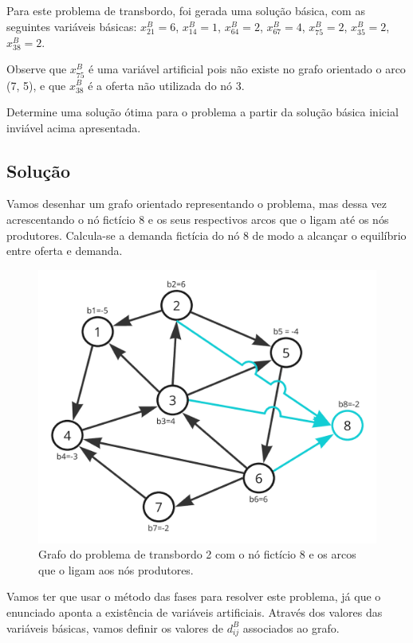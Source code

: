 \documentclass{article}
\begin{document}
Para este problema de transbordo, foi gerada uma solução básica, com as seguintes variáveis básicas:
$x^{B}_{21} = 6$,
$x^{B}_{14} = 1$,
$x^{B}_{64} = 2$,
$x^{B}_{67} = 4$,
$x^{B}_{75} = 2$,
$x^{B}_{35} = 2$,
$x^{B}_{38} = 2$.

Observe que $x^{B}_{75}$ é uma variável artificial pois não existe no grafo orientado o arco (7, 5), e que $x^{B}_{38}$ é a oferta não utilizada do nó 3.

Determine uma solução ótima para o problema a partir da solução básica inicial inviável acima apresentada.


\subsection{Solução}

Vamos desenhar um grafo orientado representando o problema, mas dessa vez acrescentando o nó fictício 8 e os seus respectivos arcos que o ligam até os nós produtores.
Calcula-se a demanda fictícia do nó 8 de modo a alcançar o equilíbrio entre oferta e demanda.

\begin{figure}[H]
    \centering
    \includegraphics[scale=0.6]{images/q2-grafo-inicial.png}
    \caption{Grafo do problema de transbordo 2 com o nó fictício 8 e os arcos que o ligam aos nós produtores.}
\end{figure}


Vamos ter que usar o método das fases para resolver este problema, já que o enunciado aponta a existência de variáveis artificiais.
Através dos valores das variáveis básicas, vamos definir os valores de $d_{ij}^{B}$ associados ao grafo.
\end{document}
